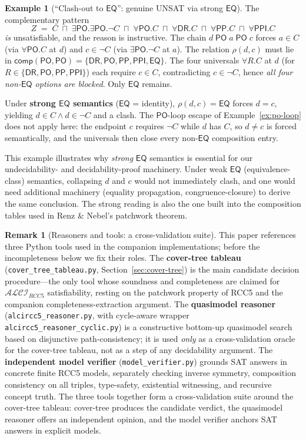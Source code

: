 \documentclass[
]{ceurart}
\theoremstyle{definition}
\newtheorem{examplex}[theorem]{Example}
\newtheorem{remark}[theorem]{Remark}
\newcommand{\ALCIRCC}[1]{\ensuremath{\mathcal{ALCI}_{\mathit{RCC#1}}}}
\newcommand{\DR}{\ensuremath{\mathsf{DR}}}
\newcommand{\PO}{\ensuremath{\mathsf{PO}}}
\newcommand{\EQ}{\ensuremath{\mathsf{EQ}}}
\newcommand{\PP}{\ensuremath{\mathsf{PP}}}
\newcommand{\PPI}{\ensuremath{\mathsf{PPI}}}
\newcommand{\comp}{\ensuremath{\mathsf{comp}}}
\begin{document}
\begin{examplex}[``Clash-out to $\EQ$'': genuine UNSAT via strong $\EQ$]
\label{ex:clash-to-eq}
The complementary pattern
\[
  Z \;=\; C
    \;\sqcap\; \exists\PO.\exists\PO.\neg C
    \;\sqcap\; \forall\PO.C
    \;\sqcap\; \forall\DR.C
    \;\sqcap\; \forall\PP.C
    \;\sqcap\; \forall\PPI.C
\]
\emph{is} unsatisfiable, and the reason is instructive. The chain
$d \;\PO\; a \;\PO\; c$ forces $a \in C$ (via $\forall\PO.C$ at $d$)
and $c \in \neg C$ (via $\exists\PO.\neg C$ at $a$). The
relation $\rho(d,c)$ must lie in
$\comp(\PO,\PO) = \{\DR,\PO,\PP,\PPI,\EQ\}$. The four universals
$\forall R.C$ at $d$ (for $R \in \{\DR,\PO,\PP,\PPI\}$) each
require $c \in C$, contradicting $c \in \neg C$, hence
\emph{all four non-$\EQ$ options are blocked}. Only $\EQ$ remains.

Under \textbf{strong $\EQ$ semantics} ($\EQ$ = identity),
$\rho(d,c) = \EQ$ forces $d = c$, yielding $d \in C \land d \in \neg C$
and a clash. The $\PO$-loop escape of
Example~\ref{ex:po-loop} does not apply here: the endpoint $c$
requires $\neg C$ while $d$ has $C$, so $d \ne c$ is forced
semantically, and the universals then close every non-$\EQ$
composition entry.

This example illustrates why \emph{strong} $\EQ$ semantics is
essential for our undecidability- and decidability-proof
machinery. Under weak $\EQ$ (equivalence-class) semantics,
collapsing $d$ and $c$ would not immediately clash, and one would
need additional machinery (equality propagation,
congruence-closure) to derive the same conclusion. The strong
reading is also the one built into the composition tables used
in Renz \& Nebel's patchwork theorem.
\end{examplex}

\begin{remark}[Reasoners and tools: a cross-validation suite]
\label{rem:tools}
This paper references three Python tools used in the companion
implementations; before the incompleteness below we fix their
roles. The \textbf{cover-tree tableau}
(\texttt{cover\_tree\_tableau.py}, Section~\ref{sec:cover-tree})
is the main candidate decision procedure---the only tool whose
soundness and completeness are claimed for $\ALCIRCC{5}$
satisfiability, resting on the patchwork property of RCC5 and
the companion completeness-extraction argument. The
\textbf{quasimodel reasoner}~\cite{QuasimodelReasoner}
(\texttt{alcircc5\_reasoner.py}, with cycle-aware wrapper
\texttt{alcircc5\_reasoner\_cyclic.py}) is a constructive
bottom-up quasimodel search based on disjunctive
path-consistency; it is used \emph{only} as a cross-validation
oracle for the cover-tree tableau, not as a step of any
decidability argument. The \textbf{independent model verifier}
(\texttt{model\_verifier.py}) grounds SAT answers in concrete
finite RCC5 models, separately checking inverse symmetry,
composition consistency on all triples, type-safety,
existential witnessing, and recursive concept truth. The three
tools together form a cross-validation suite around the
cover-tree tableau: cover-tree produces the candidate verdict,
the quasimodel reasoner offers an independent opinion, and the
model verifier anchors SAT answers in explicit models.
\end{remark}
\end{document}
